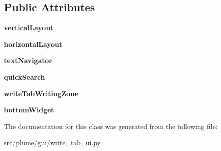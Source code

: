 \subsection*{Public Attributes}
\begin{DoxyCompactItemize}
\item 
{\bfseries vertical\+Layout}\hypertarget{classplume-creator_1_1src_1_1plume_1_1gui_1_1write__tab__ui_1_1_ui___write_tab_ad537a3b9c76cd323506823e520c81346}{}\label{classplume-creator_1_1src_1_1plume_1_1gui_1_1write__tab__ui_1_1_ui___write_tab_ad537a3b9c76cd323506823e520c81346}

\item 
{\bfseries horizontal\+Layout}\hypertarget{classplume-creator_1_1src_1_1plume_1_1gui_1_1write__tab__ui_1_1_ui___write_tab_a7c2707386205a77df26eaab73700561a}{}\label{classplume-creator_1_1src_1_1plume_1_1gui_1_1write__tab__ui_1_1_ui___write_tab_a7c2707386205a77df26eaab73700561a}

\item 
{\bfseries text\+Navigator}\hypertarget{classplume-creator_1_1src_1_1plume_1_1gui_1_1write__tab__ui_1_1_ui___write_tab_af9ed5bceeddf3721433a4aa36844cde0}{}\label{classplume-creator_1_1src_1_1plume_1_1gui_1_1write__tab__ui_1_1_ui___write_tab_af9ed5bceeddf3721433a4aa36844cde0}

\item 
{\bfseries quick\+Search}\hypertarget{classplume-creator_1_1src_1_1plume_1_1gui_1_1write__tab__ui_1_1_ui___write_tab_a7eef5738975be6953c3d07cd05cfdf96}{}\label{classplume-creator_1_1src_1_1plume_1_1gui_1_1write__tab__ui_1_1_ui___write_tab_a7eef5738975be6953c3d07cd05cfdf96}

\item 
{\bfseries write\+Tab\+Writing\+Zone}\hypertarget{classplume-creator_1_1src_1_1plume_1_1gui_1_1write__tab__ui_1_1_ui___write_tab_a00b33c1b5c16cd18a6be18f9195e7341}{}\label{classplume-creator_1_1src_1_1plume_1_1gui_1_1write__tab__ui_1_1_ui___write_tab_a00b33c1b5c16cd18a6be18f9195e7341}

\item 
{\bfseries bottom\+Widget}\hypertarget{classplume-creator_1_1src_1_1plume_1_1gui_1_1write__tab__ui_1_1_ui___write_tab_a94ab6a3308a6ef62f809459be643e705}{}\label{classplume-creator_1_1src_1_1plume_1_1gui_1_1write__tab__ui_1_1_ui___write_tab_a94ab6a3308a6ef62f809459be643e705}

\end{DoxyCompactItemize}


The documentation for this class was generated from the following file\+:\begin{DoxyCompactItemize}
\item 
src/plume/gui/write\+\_\+tab\+\_\+ui.\+py\end{DoxyCompactItemize}

